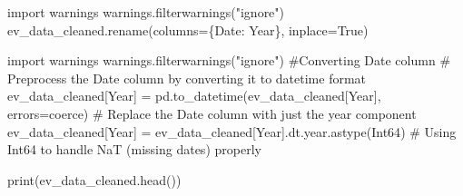 \documentclass[
  letterpaper,
  DIV=11,
  numbers=noendperiod]{scrartcl}
\newenvironment{Shaded}{\begin{snugshade}}{\end{snugshade}}
\newcommand{\BuiltInTok}[1]{\textcolor[rgb]{0.00,0.23,0.31}{#1}}
\newcommand{\CommentTok}[1]{\textcolor[rgb]{0.37,0.37,0.37}{#1}}
\newcommand{\ImportTok}[1]{\textcolor[rgb]{0.00,0.46,0.62}{#1}}
\newcommand{\NormalTok}[1]{\textcolor[rgb]{0.00,0.23,0.31}{#1}}
\newcommand{\OperatorTok}[1]{\textcolor[rgb]{0.37,0.37,0.37}{#1}}
\newcommand{\StringTok}[1]{\textcolor[rgb]{0.13,0.47,0.30}{#1}}
\newcommand{\VariableTok}[1]{\textcolor[rgb]{0.07,0.07,0.07}{#1}}
\begin{document}
\begin{Shaded}
\begin{Highlighting}[]
\ImportTok{import}\NormalTok{ warnings}
\NormalTok{warnings.filterwarnings(}\StringTok{"ignore"}\NormalTok{)}
\NormalTok{ev\_data\_cleaned.rename(columns}\OperatorTok{=}\NormalTok{\{}\StringTok{\textquotesingle{}Date\textquotesingle{}}\NormalTok{: }\StringTok{\textquotesingle{}Year\textquotesingle{}}\NormalTok{\}, inplace}\OperatorTok{=}\VariableTok{True}\NormalTok{)}
\end{Highlighting}
\end{Shaded}

\begin{Shaded}
\begin{Highlighting}[]
\ImportTok{import}\NormalTok{ warnings}
\NormalTok{warnings.filterwarnings(}\StringTok{"ignore"}\NormalTok{)}
\CommentTok{\#Converting Date column}
\CommentTok{\# Preprocess the \textquotesingle{}Date\textquotesingle{} column by converting it to datetime format}
\NormalTok{ev\_data\_cleaned[}\StringTok{\textquotesingle{}Year\textquotesingle{}}\NormalTok{] }\OperatorTok{=}\NormalTok{ pd.to\_datetime(ev\_data\_cleaned[}\StringTok{\textquotesingle{}Year\textquotesingle{}}\NormalTok{], errors}\OperatorTok{=}\StringTok{\textquotesingle{}coerce\textquotesingle{}}\NormalTok{)}
\CommentTok{\# Replace the \textquotesingle{}Date\textquotesingle{} column with just the year component}
\NormalTok{ev\_data\_cleaned[}\StringTok{\textquotesingle{}Year\textquotesingle{}}\NormalTok{] }\OperatorTok{=}\NormalTok{ ev\_data\_cleaned[}\StringTok{\textquotesingle{}Year\textquotesingle{}}\NormalTok{].dt.year.astype(}\StringTok{\textquotesingle{}Int64\textquotesingle{}}\NormalTok{)  }\CommentTok{\# Using \textquotesingle{}Int64\textquotesingle{} to handle NaT (missing dates) properly}

\BuiltInTok{print}\NormalTok{(ev\_data\_cleaned.head())}
\end{Highlighting}
\end{Shaded}
\end{document}
